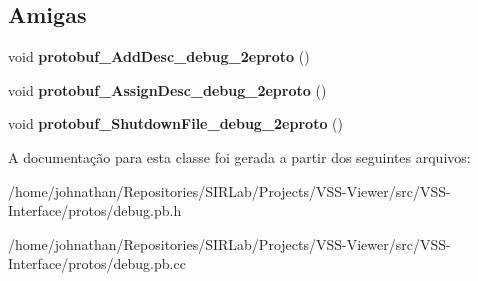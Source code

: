 \subsection*{Amigas}
\begin{DoxyCompactItemize}
\item 
void {\bfseries protobuf\+\_\+\+Add\+Desc\+\_\+debug\+\_\+2eproto} ()\hypertarget{classvss__debug_1_1Path_a1b63d082883c064c19c50d8480e334a9}{}\label{classvss__debug_1_1Path_a1b63d082883c064c19c50d8480e334a9}

\item 
void {\bfseries protobuf\+\_\+\+Assign\+Desc\+\_\+debug\+\_\+2eproto} ()\hypertarget{classvss__debug_1_1Path_acdc8c7570bce883b7ac02f39e0d06b54}{}\label{classvss__debug_1_1Path_acdc8c7570bce883b7ac02f39e0d06b54}

\item 
void {\bfseries protobuf\+\_\+\+Shutdown\+File\+\_\+debug\+\_\+2eproto} ()\hypertarget{classvss__debug_1_1Path_a887dbf1466fd19ec2c6fb3c242c65a67}{}\label{classvss__debug_1_1Path_a887dbf1466fd19ec2c6fb3c242c65a67}

\end{DoxyCompactItemize}


A documentação para esta classe foi gerada a partir dos seguintes arquivos\+:\begin{DoxyCompactItemize}
\item 
/home/johnathan/\+Repositories/\+S\+I\+R\+Lab/\+Projects/\+V\+S\+S-\/\+Viewer/src/\+V\+S\+S-\/\+Interface/protos/debug.\+pb.\+h\item 
/home/johnathan/\+Repositories/\+S\+I\+R\+Lab/\+Projects/\+V\+S\+S-\/\+Viewer/src/\+V\+S\+S-\/\+Interface/protos/debug.\+pb.\+cc\end{DoxyCompactItemize}
